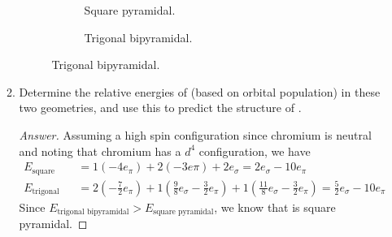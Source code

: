 \documentclass[../psets.tex]{subfiles}
\begin{document}
\begin{enumerate}[label={\Roman*)}]
\begin{enumerate}
\begin{figure}[h!]
\begin{subfigure}[b]{0.3\linewidth}
                \caption{Square pyramidal.}
            \end{subfigure}
            \begin{subfigure}[b]{0.3\linewidth}
                \centering
                \caption{Trigonal bipyramidal.}
            \end{subfigure}
        \end{figure}
        \item Determine the relative energies of  (based on orbital population) in these two geometries, and use this to predict the structure of .
        \begin{proof}[Answer]
            Assuming a high spin configuration since chromium is neutral and noting that chromium has a $d^4$ configuration, we have
            \begin{align*}
                E_\text{square pyramidal} &= 1(-4e_\pi)+2(-3e\pi)+2e_\sigma = 2e_\sigma-10e_\pi\\
                E_\text{trigonal bipyramid} &= 2\left( -\frac{7}{2}e_\pi \right)+1\left( \frac{9}{8}e_\sigma-\frac{3}{2}e_\pi \right)+1\left( \frac{11}{8}e_\sigma-\frac{3}{2}e_\pi \right) = \frac{5}{2}e_\sigma-10e_\pi
            \end{align*}
            Since $E_\text{trigonal bipyramidal}>E_\text{square pyramidal}$, we know that  is square pyramidal.
        \end{proof}
    \end{enumerate}
\end{enumerate}
\end{document}
